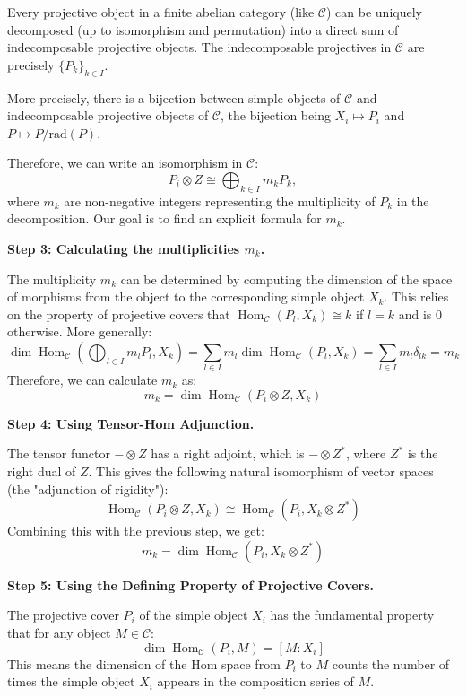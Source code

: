 \documentclass[11pt]{article}
\theoremstyle{definition}
\begin{document}
Every projective object in a finite abelian category (like \( \mathcal{C} \)) can be uniquely decomposed (up to isomorphism and permutation) into a direct sum of indecomposable projective objects. The indecomposable projectives in \( \mathcal{C} \) are precisely \( \{P_k\}_{k \in I} \).

More precisely, there is a bijection between simple objects of \( \mathcal{C} \) and indecomposable projective objects of \( \mathcal{C} \), the bijection being \( X_i \mapsto P_i \) and \( P \mapsto P/\mathrm{rad}(P) \).

Therefore, we can write an isomorphism in \( \mathcal{C} \):
\[
P_i \otimes Z \cong \bigoplus_{k \in I} m_k P_k,
\]
where \( m_k \) are non-negative integers representing the multiplicity of \( P_k \) in the decomposition. Our goal is to find an explicit formula for \( m_k \).

\textbf{Step 3: Calculating the multiplicities \( m_k \).}

The multiplicity \( m_k \) can be determined by computing the dimension of the space of morphisms from the object to the corresponding simple object \( X_k \). This relies on the property of projective covers that \( \operatorname{Hom}_{\mathcal{C}}(P_l, X_k) \cong k \) if \( l=k \) and is 0 otherwise. More generally:
\[
\operatorname{dim} \operatorname{Hom}_{\mathcal{C}}\left(\bigoplus_{l \in I} m_l P_l, X_k\right) = \sum_{l \in I} m_l \operatorname{dim} \operatorname{Hom}_{\mathcal{C}}(P_l, X_k) = \sum_{l \in I} m_l \delta_{lk} = m_k
\]
Therefore, we can calculate \( m_k \) as:
\[
m_k = \operatorname{dim} \operatorname{Hom}_{\mathcal{C}}(P_i \otimes Z, X_k)
\]

\textbf{Step 4: Using Tensor-Hom Adjunction.}

The tensor functor \( -\otimes Z \) has a right adjoint, which is \( -\otimes Z^* \), where \( Z^* \) is the right dual of \( Z \). This gives the following natural isomorphism of vector spaces (the "adjunction of rigidity"):
\[
\operatorname{Hom}_{\mathcal{C}}(P_i \otimes Z, X_k) \cong \operatorname{Hom}_{\mathcal{C}}(P_i, X_k \otimes Z^*)
\]
Combining this with the previous step, we get:
\[
m_k = \operatorname{dim} \operatorname{Hom}_{\mathcal{C}}(P_i, X_k \otimes Z^*)
\]

\textbf{Step 5: Using the Defining Property of Projective Covers.}

The projective cover \( P_i \) of the simple object \( X_i \) has the fundamental property that for any object \( M \in \mathcal{C} \):
\[
\operatorname{dim} \operatorname{Hom}_{\mathcal{C}}(P_i, M) = [M:X_i]
\]
This means the dimension of the Hom space from \( P_i \) to \( M \) counts the number of times the simple object \( X_i \) appears in the composition series of \( M \).
\end{document}
